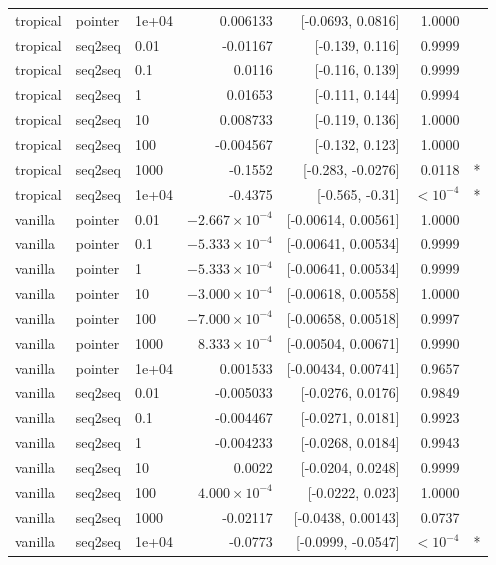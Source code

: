 \documentclass[10pt]{article}
\begin{document}
{\begin{longtable}{lllrrrl}
tropical & pointer & 1e+04 & 0.006133 & [-0.0693, 0.0816] & 1.0000 & \\
tropical & seq2seq & 0.01 & -0.01167 & [-0.139, 0.116] & 0.9999 & \\
tropical & seq2seq & 0.1 & 0.0116 & [-0.116, 0.139] & 0.9999 & \\
tropical & seq2seq & 1 & 0.01653 & [-0.111, 0.144] & 0.9994 & \\
tropical & seq2seq & 10 & 0.008733 & [-0.119, 0.136] & 1.0000 & \\
tropical & seq2seq & 100 & -0.004567 & [-0.132, 0.123] & 1.0000 & \\
tropical & seq2seq & 1000 & -0.1552 & [-0.283, -0.0276] & 0.0118 & *\\
tropical & seq2seq & 1e+04 & -0.4375 & [-0.565, -0.31] & $<10^{-4}$ & *\\
vanilla & pointer & 0.01 & $-2.667\times10^{-4}$ & [-0.00614, 0.00561] & 1.0000 & \\
vanilla & pointer & 0.1 & $-5.333\times10^{-4}$ & [-0.00641, 0.00534] & 0.9999 & \\
vanilla & pointer & 1 & $-5.333\times10^{-4}$ & [-0.00641, 0.00534] & 0.9999 & \\
vanilla & pointer & 10 & $-3.000\times10^{-4}$ & [-0.00618, 0.00558] & 1.0000 & \\
vanilla & pointer & 100 & $-7.000\times10^{-4}$ & [-0.00658, 0.00518] & 0.9997 & \\
vanilla & pointer & 1000 & $8.333\times10^{-4}$ & [-0.00504, 0.00671] & 0.9990 & \\
vanilla & pointer & 1e+04 & 0.001533 & [-0.00434, 0.00741] & 0.9657 & \\
vanilla & seq2seq & 0.01 & -0.005033 & [-0.0276, 0.0176] & 0.9849 & \\
vanilla & seq2seq & 0.1 & -0.004467 & [-0.0271, 0.0181] & 0.9923 & \\
vanilla & seq2seq & 1 & -0.004233 & [-0.0268, 0.0184] & 0.9943 & \\
vanilla & seq2seq & 10 & 0.0022 & [-0.0204, 0.0248] & 0.9999 & \\
vanilla & seq2seq & 100 & $4.000\times10^{-4}$ & [-0.0222, 0.023] & 1.0000 & \\
vanilla & seq2seq & 1000 & -0.02117 & [-0.0438, 0.00143] & 0.0737 & \\
vanilla & seq2seq & 1e+04 & -0.0773 & [-0.0999, -0.0547] & $<10^{-4}$ & *\\
\bottomrule
\end{longtable}
}
\end{document}
